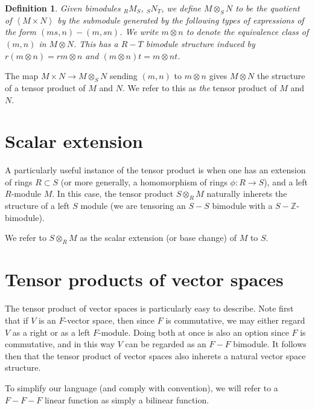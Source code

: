 \documentclass[12pt]{report}
\theoremstyle{plain}
\newtheorem{defn}[thm]{Definition}
\newcommand{\ZZ}{\mathbb{Z}}
\begin{document}
\begin{defn}
Given bimodules $_R M _S$, $_S N _T$, we define $M \otimes_S N$ to be the
quotient of $\left< M \times N \right>$ by the submodule generated by
the following types of expressions of the form $(ms, n) - (m, sn)$.
We write $m \otimes n$ to denote the equivalence class of $(m,
n)$ in $M \otimes N$. This has a $R-T$ bimodule structure induced by $r(m
\otimes n) = rm \otimes n$ and $(m \otimes n) t = m \otimes nt$.
\end{defn}

The map $M \times N \to M \otimes_S N$ sending $(m, n)$ to $m \otimes n$
gives $M \otimes N$ the structure of a tensor product of $M$ and $N$. We
refer to this as \textit{the} tensor product of $M$ and $N$.

\section{Scalar extension}

A particularly useful instance of the tensor product is when one has an
extension of rings $R \subset S$ (or more generally, a homomorphism of
rings $\phi : R \to S$), and a left $R$-module $M$. In this case, the
tensor product $S \otimes_R M$ naturally inherets the structure of a left
$S$ module (we are tensoring an $S-S$ bimodule with a $S-\ZZ$-bimodule).

We refer to $S \otimes_R M$ as the scalar extension (or base change) of $M$
to $S$.

\section{Tensor products of vector spaces}

The tensor product of vector spaces is particularly easy to describe. Note
first that if $V$ is an $F$-vector space, then since $F$ is commutative, we
may either regard $V$ as a right or as a left $F$-module. Doing both at
once is also an option since $F$ is commutative, and in this way $V$ can be
regarded as an $F-F$ bimodule. It follows then that the tensor product of
vector spaces also inherets a natural vector space structure.

To simplify our language (and comply with convention), we will refer to a
$F-F-F$ linear function as simply a bilinear function.
\end{document}
